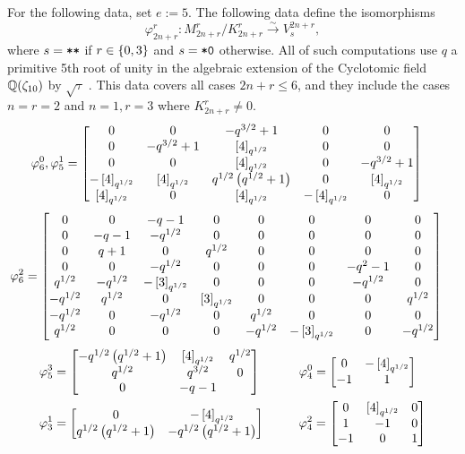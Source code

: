 \documentclass{amsart}
\begin{document}
For the following data, set $e := 5$.
The following data define the isomorphisms \[\varphi_{2n + r}^r: M_{2n + r}^r / K_{2n + r}^r \xrightarrow{\sim} V_{s}^{2n + r},\] where $s = \texttt{*}\texttt{*}$ if $r \in \left\{ 0,3 \right\}$ and $s = \texttt{*}\texttt{0}$ otherwise.
All of such computations use $q$ a primitive 5th root of unity in the algebraic extension of the Cyclotomic field $\mathbb{Q}(\zeta_{10})$ by $\sqrt\tau$ \cite{Github}.
This data covers all cases $2n + r \leq 6$, and they include the cases $n = r = 2$ and $n = 1, r = 3$ where $K_{2n + r}^r \neq 0$.
\def\tho{q^{3/2} + 1}
\def\tht{\brk{4}_{q^{1/2}}}
\def\to{q^{1/2}\prn{q^{1/2} + 1}}
\begin{align*}
  \varphi_6^0, \varphi_5^1 &= \begin{bmatrix}
    0 & 0 & -\tho & 0 & 0\\
    0 & -\tho & \tht & 0 & 0\\
    0 & 0 & \tht & 0 & -\tho\\
    -\tht & \tht & \to & 0 & \tht\\
    \tht & 0 & \tht & -\tht & 0
  \end{bmatrix}
\end{align*}
\begin{align*}
  \varphi_6^2 &= \begin{bmatrix}
    0 & 0 & - q - 1 & 0 & 0 & 0 & 0 & 0\\
    0 & -q - 1 & -q^{1/2} & 0 & 0 & 0 & 0 & 0\\
    0 & q + 1 & 0 & q^{1/2} & 0 & 0 & 0 & 0\\
    0 & 0 & -q^{1/2} & 0 & 0 & 0 & -q^2 - 1 & 0\\
    q^{1/2} & -q^{1/2} & -\left[ 3 \right]_{q^{1/2}} & 0 & 0 & 0 & -q^{1/2} & 0\\
   -q^{1/2} & q^{1/2} & 0 & \left[ 3 \right]_{q^{1/2}} &0 & 0 & 0 & q^{1/2}\\
   -q^{1/2} & 0 & -q^{1/2} & 0 & q^{1/2} & 0 & 0 & 0\\
    q^{1/2} & 0 & 0 & 0 & -q^{1/2} & -\left[ 3 \right]_{q^{1/2}} & 0 & -q^{1/2}
  \end{bmatrix}
\end{align*}
\begin{align*}
  \varphi_5^3 &= \begin{bmatrix}
    -\to & \tht & q^{1/2}\\
    q^{1/2} & q^{3/2} & 0\\
    0 & -q - 1
  \end{bmatrix}  \hspace{30pt} 
  \varphi_4^0 = \begin{bmatrix}
      0 & -\tht\\
    -1 & 1
  \end{bmatrix}\\
  \varphi_3^1 &= \begin{bmatrix}
    0 & -\tht\\
    \to & -\to
  \end{bmatrix} \hspace{27pt}
  \varphi_4^2 = \begin{bmatrix}
    0 & \tht & 0\\
    1 & -1 & 0\\
    -1 & 0 & 1
  \end{bmatrix}
\end{align*}
\end{document}

